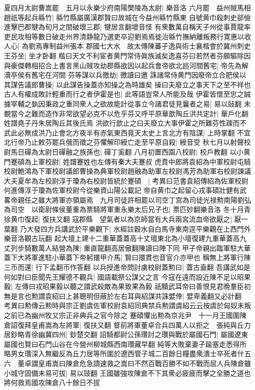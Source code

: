夏四月太尉曹嵩罷　五月以永樂少府南陽樊陵為太尉|{
	樂音洛}
六月罷　益州賊馬相趙祇等起兵緜竹|{
	緜竹縣屬廣漢郡賢曰故城在今益州緜竹縣東}
自號黄巾殺刺史郤儉進擊巴郡犍為旬月之間破壞三郡|{
	犍居言翻壞音怪}
有衆數萬自稱天子州從事賈龍率吏民攻相等數日破走州界清静龍乃選吏卒迎劉焉焉徙治緜竹撫納離叛務行寛惠以收人心|{
	為劉焉專制益州張本}
郡國七大水　故太傳陳蕃子逸與術士襄楷會於冀州刺史王芬坐|{
	坐才卧翻}
楷曰天文不利宦者黄門常侍眞族滅矣逸喜芬曰若然者芬願驅除因與豪傑轉相招合上書言黑山賊攻劫郡縣欲因以起兵會帝欲北廵河間舊宅|{
	帝先為解瀆亭侯有舊宅在河間}
芬等謀以兵徼劫|{
	徼讀曰邀}
誅諸常侍黄門因廢帝立合肥侯以其謀告議郎曹操|{
	以此謀告操蓋亦知操之為時雄矣}
操曰夫廢立之事天下之至不祥也古人有權成敗計輕重而行之者伊霍是也|{
	此等語豈常人所能及哉}
伊霍皆懷至忠之誠據宰輔之埶因秉政之重同衆人之欲故能計從事立今諸君徒見曩者之易|{
	易以䜴翻}
未覩當今之難而造作非常欲望必克不以危乎芬又呼平原華歆陶丘洪共定計|{
	華戶化翻姓譜堯子丹朱居陶丘其後氏焉}
洪欲行歆止之曰夫廢立大事伊霍之所難芬性疎而不武此必無成洪乃止會北方夜半有赤氣東西竟天太史上言北方有陰謀|{
	上時掌翻}
不宜北行帝乃止敕芬罷兵俄而徵之芬懼解印綬亡走至平原自殺|{
	綬音受}
秋七月以射聲校尉馬日磾為太尉日磾融之族孫也|{
	磾丁奚翻}
八月初置西園八校尉|{
	校戶教翻}
以小黄門蹇碩為上軍校尉|{
	姓譜蹇姓也左傳有秦大夫蹇叔}
虎賁中郎將袁紹為中軍校尉屯騎校尉鮑鴻為下軍校尉議郎曹操為典軍校尉趙融為助軍左校尉馮芳為助軍右校尉諫議大夫夏牟為左校尉淳于瓊為右校尉皆統於蹇碩　|{
	考異曰范書袁紹傳紹為佐軍校尉何進傳淳于瓊為佐軍校尉今從樂資山陽公載記}
帝自黄巾之起留心戎事碩壯健有武畧帝親任之雖大將軍亦領屬焉　九月司徒許相罷以司空丁宫為司徒光禄勲南陽劉弘為司空　以衛尉條侯董重為票騎將軍重永樂太后兄子也|{
	票匹妙翻樂音洛}
冬十月青徐黄巾復起|{
	復扶又翻}
寇郡縣　望氣者以為京師當有大兵兩宮流血帝欲厭之|{
	厭一葉翻}
乃大發四方兵講武於平樂觀下|{
	水經註穀水自白馬寺東南逕平樂觀在上西門外樂音洛觀古玩翻}
起大壇上建十二重華蓋蓋高十丈壇東北為小壇復建九重華蓋高九丈列步騎數萬人結營為陳|{
	重直龍翻高居傲翻陳讀曰陣下同}
甲子帝親出臨軍駐大華蓋下大將軍進駐小華蓋下帝躬擐甲介馬|{
	賢曰擐貫也音官介亦甲也}
稱無上將軍行陳三币而還|{
	行下孟翻帀作答翻}
以兵授進帝問討虜校尉蓋勲曰|{
	蓋古盍翻}
吾講武如是何如對曰臣聞先王耀德不觀兵|{
	國語載祭公謀父之言}
今寇在遠而設近陳不足以昭果毅|{
	左傳曰戎昭果毅以聽之謂武殺敵為果致果為毅}
祇黷武耳帝曰善恨見君晩羣臣初無是言也勲謂袁紹曰上甚聰明但蔽於左右耳與紹謀共誅嬖倖|{
	嬖卑義翻又必計翻　考異曰勲傳云勲時與宗正劉虞佐軍校尉袁紹同典禁兵勲謂虞紹云云按虞於匈奴未叛之前已為幽州牧又宗正非典兵之官今除之}
蹇碩懼出勲為京兆尹　十一月王國圍陳倉詔復拜皇甫嵩為左將軍|{
	復扶又翻}
督前將軍董卓合兵四萬人以拒之　張純與丘力居鈔略青徐幽冀四州|{
	鈔楚交翻}
詔騎都尉公孫瓚討之瓚與戰於屬國石門|{
	屬國遼東屬國也賢曰石門山谷在今營州柳城縣西南瓚藏早翻}
純等大敗棄妻子踰塞走悉得所略男女瓚深入無繼反為丘力居等所圍於遼西管子城二百餘日糧盡衆潰士卒死者什五六　董卓謂皇甫嵩曰陳倉危急請速救之嵩曰不然百戰百勝不如不戰而屈人兵陳倉雖小城守固備未易可拔|{
	易以豉翻}
王國雖強攻陳倉不下其衆必疲疲而擊之全勝之道也將何救焉國攻陳倉八十餘日不拔

